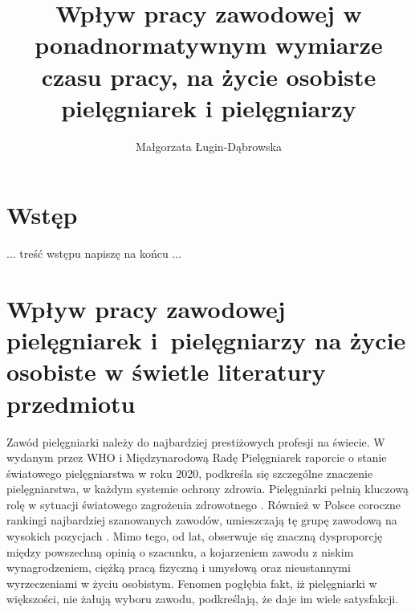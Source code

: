 \documentclass[a4paper,12pt,twoside,openany]{report}
\title{Wpływ pracy zawodowej  w ponadnormatywnym wymiarze czasu pracy, na życie osobiste pielęgniarek i pielęgniarzy}
\author{Małgorzata Ługin-Dąbrowska}
\begin{document}
\sloppy
\maketitle



\chapter*{Wstęp}
... treść wstępu napiszę na końcu ...



\chapter{Wpływ pracy zawodowej pielęgniarek i~pielęgniarzy na życie osobiste w świetle literatury przedmiotu}
Zawód pielęgniarki należy do najbardziej prestiżowych profesji na świecie. W wydanym przez WHO i Międzynarodową Radę Pielęgniarek raporcie o stanie światowego pielęgniarstwa w roku 2020, podkreśla się szczególne znaczenie pielęgniarstwa, w każdym systemie ochrony zdrowia. Pielęgniarki pełnią kluczową rolę w sytuacji światowego zagrożenia zdrowotnego \cite{who}.  Również w Polsce coroczne rankingi najbardziej szanowanych zawodów, umieszczają tę grupę zawodową na wysokich pozycjach \cite{rap}. Mimo tego, od lat, obserwuje się znaczną dysproporcję między powszechną opinią o szacunku, a kojarzeniem zawodu z niskim wynagrodzeniem, ciężką pracą fizyczną i umysłową oraz nieustannymi wyrzeczeniami w życiu osobistym. Fenomen pogłębia fakt, iż pielęgniarki w większości, nie żałują wyboru zawodu, podkreślają, że daje  im wiele satysfakcji.

\end{document}
